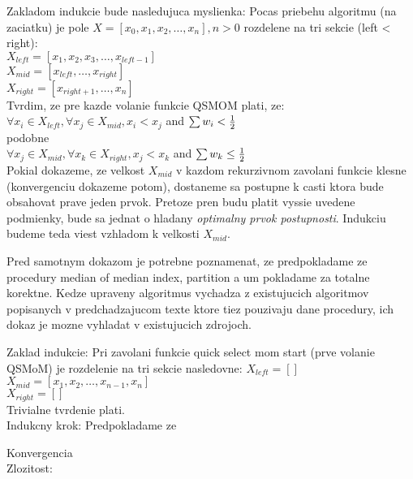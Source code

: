 \documentclass[paper=a4, fontsize=11pt]{scrartcl} %
\numberwithin{equation}{section} %
\numberwithin{figure}{section} %
\numberwithin{table}{section} %
\begin{document}
Zakladom indukcie bude nasledujuca myslienka:
Pocas priebehu algoritmu (na zaciatku) je pole $X = [x_0, x_1, x_2, \dots, x_n], n > 0$ rozdelene na tri sekcie (left < right): \\
$X_{left} = [x_1, x_2, x_3, \dots, x_{left-1}]$\\
$X_{mid} = [x_{left}, \dots, x_{right}]$\\
$X_{right} = [x_{right+1}, \dots, x_n]$\\
Tvrdim, ze pre kazde volanie funkcie QSMOM plati, ze:\\
$\forall x_i \in X_{left}, \forall x_j \in X_{mid}, x_i < x_j$ and $ \sum w_i < \frac{1}{2} \\$ \\
podobne \\
$\forall x_j \in X_{mid}, \forall x_k \in X_{right}, x_j < x_k$ and $ \sum w_k \leq \frac{1}{2} \\$ \\

Pokial dokazeme, ze velkost $X_{mid}$ v kazdom rekurzivnom zavolani funkcie klesne (konvergenciu dokazeme potom), dostaneme sa postupne k casti ktora bude obsahovat prave jeden prvok. Pretoze pren budu platit vyssie uvedene podmienky, bude sa jednat o hladany {\em optimalny prvok postupnosti}. Indukciu budeme teda viest vzhladom k velkosti $X_{mid}$.

Pred samotnym dokazom je potrebne poznamenat, ze predpokladame ze procedury median of median index, partition a um pokladame za totalne korektne. Kedze upraveny algoritmus vychadza z existujucich algoritmov popisanych v predchadzajucom texte ktore tiez pouzivaju dane procedury, ich dokaz je mozne vyhladat v existujucich zdrojoch.

Zaklad indukcie:
Pri zavolani funkcie quick select mom start (prve volanie QSMoM) je rozdelenie na tri sekcie nasledovne:
$X_{left} = []$\\
$X_{mid} = [x_1, x_2, \dots, x_{n-1}, x_n]$\\
$X_{right} = []$\\
Trivialne tvrdenie plati. \\

Indukcny krok:
Predpokladame ze

Konvergencia \\
Zlozitost: \\

\pagebreak
\end{document}
